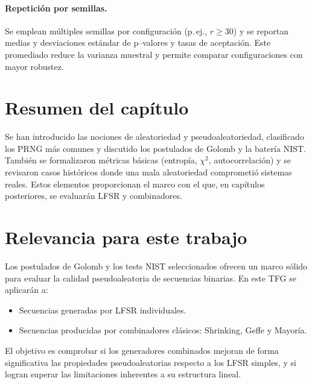 \paragraph{Repetición por semillas.}
Se emplean múltiples semillas por configuración (p.\,ej., $r\ge 30$) y se reportan medias y desviaciones estándar de p--valores y tasas de aceptación. Este promediado reduce la varianza muestral y permite comparar configuraciones con mayor robustez.


\section*{Resumen del capítulo}
Se han introducido las nociones de aleatoriedad y pseudoaleatoriedad, clasificado los PRNG más comunes y discutido los postulados de Golomb y la batería NIST.
También se formalizaron métricas básicas (entropía, $\chi^2$, autocorrelación) y se revisaron casos históricos donde una mala aleatoriedad comprometió sistemas reales.
Estos elementos proporcionan el marco con el que, en capítulos posteriores, se evaluarán LFSR y combinadores.


\section*{Relevancia para este trabajo}

Los postulados de Golomb y los tests NIST seleccionados ofrecen un marco sólido
para evaluar la calidad pseudoaleatoria de secuencias binarias. En este TFG se
aplicarán a:
\begin{itemize}
    \item Secuencias generadas por LFSR individuales.
    \item Secuencias producidas por combinadores clásicos: Shrinking, Geffe y
    Mayoría.
\end{itemize}

El objetivo es comprobar si los generadores combinados mejoran de forma
significativa las propiedades pseudoaleatorias respecto a los LFSR simples, y
si logran superar las limitaciones inherentes a su estructura lineal.
